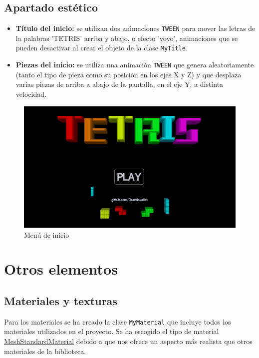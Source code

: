 \documentclass[11pt,a4paper]{article}
\begin{document}
    \subsection{Apartado estético}
    \begin{itemize}
        \item \textbf{Título del inicio:} se utilizan dos animaciones \texttt{TWEEN} para mover las letras de la palabras 'TETRIS' arriba y abajo, o efecto 'yoyo', animaciones que se pueden desactivar al crear el objeto de la clase \texttt{MyTitle}.
        \item \textbf{Piezas del inicio:} se utiliza una animación \texttt{TWEEN} que genera aleatoriamente (tanto el tipo de pieza como su posición en los ejes X y Z) y que desplaza varias piezas de arriba a abajo de la pantalla, en el eje Y, a distinta velocidad.
    \end{itemize}
    
    \begin{figure}[H]
        \centering
        \includegraphics[scale=0.29]{menu.jpg}
        \caption{Menú de inicio}
    \end{figure}
    
\section{Otros elementos}

    \subsection{Materiales y texturas}
    
    Para los materiales se ha creado la clase \texttt{MyMaterial} que incluye todos los materiales utilizados en el proyecto. Se ha escogido el tipo de material \href{https://threejs.org/docs/#api/en/materials/MeshStandardMaterial}{MeshStandardMaterial} debido a que nos ofrece un aspecto más realista que otros materiales de la biblioteca.\\
    
\end{document}
